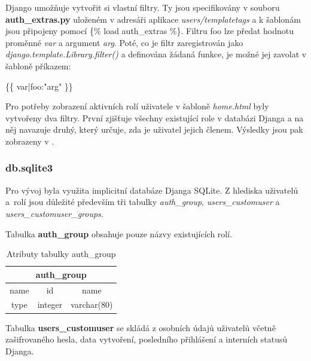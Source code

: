 Django umožňuje vytvořit si vlastní filtry. Ty jsou specifikovány v
souboru \textbf{auth\_extras.py} uloženém v adresáři aplikace
\textit{users/templatetags} a k šablonám jsou připojeny pomocí
\textsf{\{\% load auth\_extras \%\}}. Filtru \textsf{foo} lze předat
hodnotu proměnné \textit{var} a argument \textit{arg}. Poté, co je
filtr zaregistrován jako \textit{django.template.Library.filter()} a
definována žádaná funkce, je možné jej zavolat v šabloně příkazem:

\textsf{\{\{ var|foo:"arg" \}\}}

Pro potřeby zobrazení aktivních rolí uživatele v šabloně
\textit{home.html} byly vytvořeny dva filtry. První zjišťuje všechny
existující role v databázi Djanga a na něj navazuje druhý, který
určuje, zda je uživatel jejich členem. Výsledky jsou pak zobrazeny v
.

\subsubsection{db.sqlite3}

Pro vývoj byla využita implicitní databáze Djanga SQLite. Z hlediska
uživatelů a~rolí jsou důležité především tři tabulky
\textit{auth\_group}, \textit{users\_customuser} a\newline
\textit{users\_customuser\_groups}.

Tabulka \textbf{auth\_group} obsahuje pouze názvy existujících rolí.

\begin{table}[H]
\centering
\begin{tabular}{@{}|c|c|c|@{}}
\toprule
\multicolumn{3}{|c|}{auth\_group} \\ \midrule
name & id & name \\ \midrule
type & integer & varchar(80) \\ \bottomrule
\end{tabular}
\caption{Atributy tabulky auth\_group}
\label{tab:auth-group}
\end{table}

Tabulka \textbf{users\_customuser} se skládá z osobních údajů uživatelů
včetně zašifrovaného hesla, data vytvoření, posledního přihlášení a
interních statusů Djanga.

\begin{table}[H]
\centering
{}
\caption{Atributy tabulky users\_customuser 1/2}
\label{tab:users-customuser-1}
\end{table}

